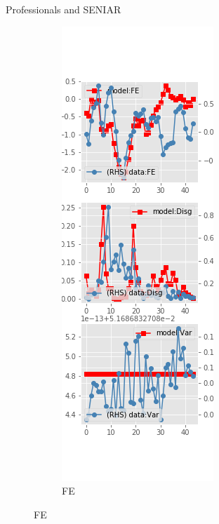 \documentclass{beamer}
\begin{document}
\begin{frame}{Professionals and SENIAR}
	\begin{figure}[ht]
		\label{SENI_diag_SPF}
		\begin{subfigure}[b]{0.2\textwidth}
			\centering
			\caption{FE}
			\includegraphics[width=\textwidth, height = 0.8\textheight]{figuresDraft/spf_seni_est_diag0.png}

\end{subfigure}
\end{figure}
\end{frame}
\end{document}
